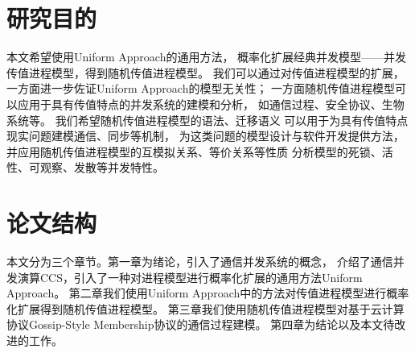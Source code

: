 \section{研究目的}
本文希望使用Uniform Approach的通用方法，
概率化扩展经典并发模型——并发传值进程模型，得到随机传值进程模型。
我们可以通过对传值进程模型的扩展，
一方面进一步佐证Uniform Approach的模型无关性；
一方面随机传值进程模型可以应用于具有传值特点的并发系统的建模和分析，
如通信过程、安全协议、生物系统等。
我们希望随机传值进程模型的语法、迁移语义
可以用于为具有传值特点现实问题建模通信、同步等机制，
为这类问题的模型设计与软件开发提供方法，
并应用随机传值进程模型的互模拟关系、等价关系等性质
分析模型的死锁、活性、可观察、发散等并发特性。

\section{论文结构}
本文分为三个章节。第一章为绪论，引入了通信并发系统的概念，
介绍了通信并发演算CCS，引入了一种对进程模型进行概率化扩展的通用方法Uniform Approach。
第二章我们使用Uniform Approach中的方法对传值进程模型进行概率化扩展得到随机传值进程模型。
第三章我们使用随机传值进程模型对基于云计算协议Gossip-Style Membership协议的通信过程建模。
第四章为结论以及本文待改进的工作。
